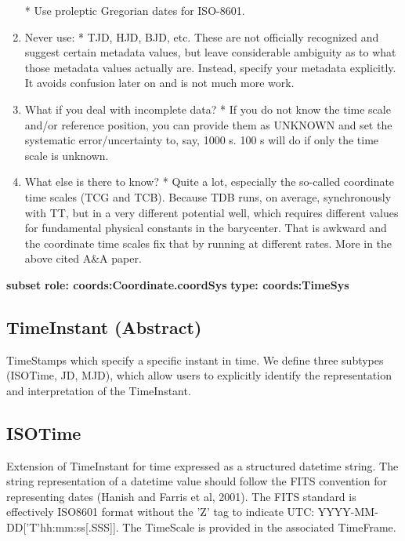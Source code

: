 \begin{enumerate}
     * Use proleptic Gregorian dates for ISO-8601.
    \item Never use:  \newline
     * TJD, HJD, BJD, etc. These are not officially recognized and suggest certain metadata values, but leave considerable ambiguity as to what those metadata values actually are. Instead, specify your metadata explicitly. It avoids confusion later on and is not much more work.
    \item What if you deal with incomplete data?  \newline
     * If you do not know the time scale and/or reference position, you can provide them as UNKNOWN and set the systematic error/uncertainty to, say, 1000 s. 100 s will do if only the time scale is unknown.
    \item What else is there to know?  \newline
     * Quite a lot, especially the so-called coordinate time scales (TCG and TCB). Because TDB runs, on average, synchronously with TT, but in a very different potential well, which requires different values for fundamental physical constants in the barycenter. That is awkward and the coordinate time scales fix that by running at different rates. More in the above cited A\&A paper.\newline
    \end{enumerate}

    \noindent \textbf{subset} \newline
    \indent   \textbf{role: coords:Coordinate.coordSys} \newline
    \indent   \textbf{type: coords:TimeSys} \newline

  \subsection{TimeInstant (Abstract)}
  \label{sect:TimeInstant}
    TimeStamps which specify a specific instant in time. We define three subtypes (ISOTime, JD, MJD), which allow users to explicitly identify the representation and interpretation of the TimeInstant.

  \subsection{ISOTime}
  \label{sect:ISOTime}
    Extension of TimeInstant for time expressed as a structured datetime string. The string representation of a datetime value should follow the FITS convention for representing dates (Hanish and Farris et al, 2001). The FITS standard is effectively ISO8601 format without the 'Z' tag to indicate UTC: YYYY-MM-DD['T'hh:mm:ss[.SSS]]. The TimeScale is provided in the associated TimeFrame.

